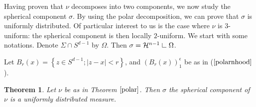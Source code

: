 \documentclass[11pt]{article}
\newtheorem{theorem}{Theorem}[section]
\theoremstyle{definition}
\theoremstyle{remark}
\numberwithin{equation}{section}
\newcommand{\res}{\hbox{{\vrule height .22cm}{\leaders\hrule\hskip .2cm}}}
\def\res{\hbox{ {\vrule height .22cm}{\leaders\hrule\hskip.2cm} } }
\begin{document}
Having proven that $\nu$ decomposes into two components, we now study the spherical component $\sigma$. By using the polar decomposition, we can prove that $\sigma$ is uniformly distributed. Of particular interest to us is the case where $\nu$ is $3$-uniform: the spherical component is then locally $2$-uniform.
We start with some notations.
Denote $\Sigma \cap S^{d-1}$ by $\Omega$. Then $\sigma = \mathcal{H}^{n-1} \res \Omega$. 

Let $B_r(x)= \left\lbrace z \in S^{d-1} ; |z-x| <r \right\rbrace$, and 
$\left(B_r(x)\right)_{1}^{\epsilon}$ be as in ($\ref{polarnhood}$).


  \begin{theorem}\label{spherunifdist} Let $\nu$ be as in Theorem $\ref{polar}$. Then $\sigma$ the spherical component of $\nu$  is a uniformly distributed measure. \end{theorem}
\end{document}
